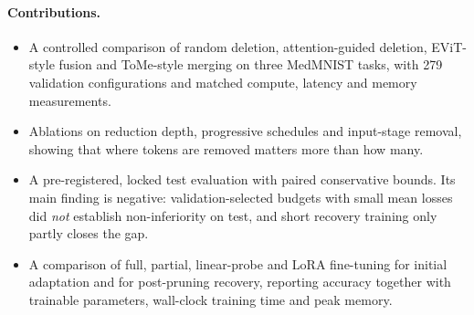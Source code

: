 \paragraph{Contributions.}
\begin{itemize}
  \item A controlled comparison of random deletion, attention-guided deletion, EViT-style fusion and ToMe-style merging on three MedMNIST tasks, with 279 validation configurations and matched compute, latency and memory measurements.
  \item Ablations on reduction depth, progressive schedules and input-stage removal, showing that where tokens are removed matters more than how many.
  \item A pre-registered, locked test evaluation with paired conservative bounds. Its main finding is negative: validation-selected budgets with small mean losses did \emph{not} establish non-inferiority on test, and short recovery training only partly closes the gap.
  \item A comparison of full, partial, linear-probe and LoRA fine-tuning for initial adaptation and for post-pruning recovery, reporting accuracy together with trainable parameters, wall-clock training time and peak memory. 
\end{itemize}
